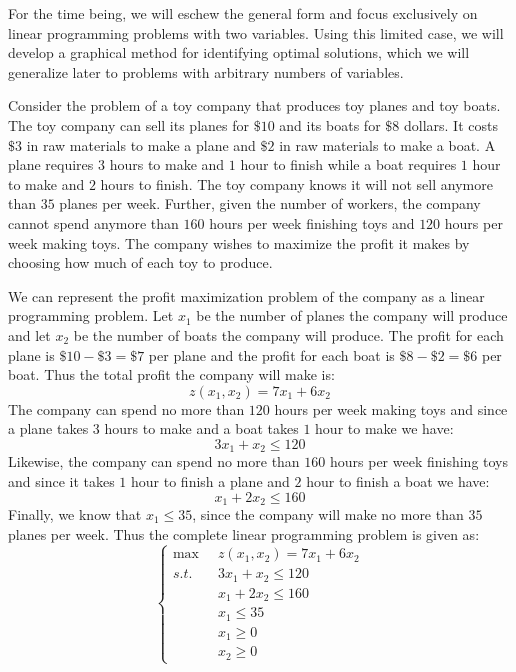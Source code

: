 For the time being, we will eschew the general form and focus exclusively on linear programming problems with two variables. Using this limited case, we will develop a graphical method for identifying optimal solutions, which we will generalize later to problems with arbitrary numbers of variables. 

\begin{example} Consider the problem of a toy company that produces toy planes and toy boats. The toy company can sell its planes for $\$10$ and its boats for $\$8$ dollars. It costs $\$3$ in raw materials to make a plane and $\$2$ in raw materials to make a boat. A plane requires $3$ hours to make and $1$ hour to finish while a boat requires $1$ hour to make and $2$ hours to finish. The toy company knows it will not sell anymore than $35$ planes per week. Further, given the number of workers, the company cannot spend anymore than $160$ hours per week finishing toys and $120$ hours per week making toys. The company wishes to maximize the profit it makes by choosing how much of each toy to produce. 

We can represent the profit maximization problem of the company as a linear programming problem. Let $x_1$ be the number of planes the company will produce and let $x_2$ be the number of boats the company will produce. The profit for each plane is $\$10 - \$3 = \$7$ per plane and the profit for each boat is $\$8 - \$2 = \$6$ per boat. Thus the total profit the company will make is:
\begin{equation}
z(x_1,x_2) = 7x_1 + 6x_2
\end{equation}
The company can spend no more than $120$ hours per week making toys and since a plane takes $3$ hours to make and a boat takes $1$ hour to make we have:
\begin{equation}
3x_1 + x_2 \leq 120
\end{equation}
Likewise, the company can spend no more than $160$ hours per week finishing toys and since it takes $1$ hour to finish a plane and $2$ hour to finish a boat we have:
\begin{equation}
x_1 + 2x_2 \leq 160
\end{equation}
Finally, we know that $x_1 \leq 35$, since the company will make no more than $35$ planes per week. Thus the complete linear programming problem is given as:
\begin{equation}
\left\{
\begin{aligned}
\max\;\;& z(x_1,x_2) = 7x_1 + 6x_2\\
s.t.\;\;&  3x_1 + x_2 \leq 120\\
& x_1 + 2x_2 \leq 160\\
& x_1 \leq 35\\
& x_1 \geq 0\\
& x_2 \geq 0
\end{aligned}
\right.
\label{eqn:ToyMakerEx}
\end{equation}
\label{ex:ToyMaker}
\end{example}

